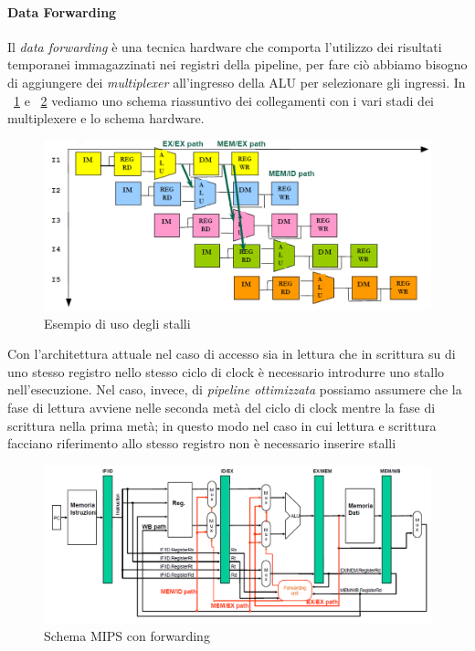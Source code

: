 \paragraph{Data Forwarding}
Il \emph{data forwarding} è una tecnica hardware che comporta l'utilizzo dei risultati temporanei immagazzinati nei registri della pipeline, per fare ciò abbiamo bisogno di aggiungere dei \emph{multiplexer} all'ingresso della ALU per selezionare gli ingressi. In \figurename~\ref{fig:forwardingpath} e \figurename~\ref{fig:forwardingcirc} vediamo uno schema riassuntivo dei collegamenti con i vari stadi dei multiplexere e lo schema hardware.
\begin{figure}[tb]
\centering
\includegraphics[scale=0.45]{img/forwardingpath.png}
\caption{Esempio di uso degli stalli}\label{fig:forwardingpath}
\end{figure}
Con l'architettura attuale nel caso di accesso sia in lettura che in scrittura su di uno stesso registro nello stesso ciclo di clock è necessario introdurre uno stallo nell'esecuzione. Nel caso, invece, di \emph{pipeline ottimizzata} possiamo assumere che la fase di lettura avviene nelle seconda metà del ciclo di clock mentre la fase di scrittura nella prima metà; in questo modo nel caso in cui lettura e scrittura facciano riferimento allo stesso registro non è necessario inserire stalli
\begin{figure}[!tb]
\centering
\includegraphics[scale=0.7,angle=90]{img/forwardingcirc.png}
\caption{Schema MIPS con forwarding}\label{fig:forwardingcirc}
\end{figure}
\pagebreak
